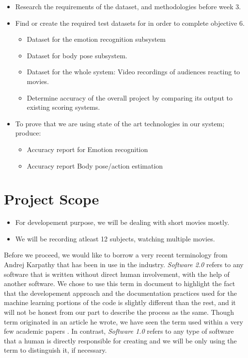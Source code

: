 \documentclass[12pt,a4paper,man]{report}
\begin{document}
\begin{itemize}
\item Research the requirements of the dataset, and methodologies before week 3.
\item Find or create the required test datasets for in order to complete objective 6.
\begin{itemize}
\item Dataset for the emotion recognition subsystem
\item Dataset for body pose subsystem.
\item Dataset for the whole system: Video recordings of audiences reacting to movies.
\item Determine accuracy of the overall project by comparing its output to existing scoring systems.
\end{itemize}
\item To prove that we are using state of the art technologies in our system; produce:
\begin{itemize}
\item Accuracy report for Emotion recognition
\item Accuracy report Body pose/action estimation
\end{itemize}
\end{itemize}

\chapter{Project Scope}
\label{sec:org2caf9ae}
\begin{itemize}
\item For developement purpose, we will be dealing with short movies mostly.
\item We will be recording atleast 12 subjects, watching multiple movies.
\end{itemize}

Before we proceed, we would like to borrow a very recent terminology from Andrej Karpathy that has been in use in the industry. \emph{Software 2.0} refers to any software that is written without direct human involvement, with the help of another software. We chose to use this term in document to highlight the fact that the developement approach and the documentation practices used for the machine learning portions of the code is slightly different than the rest, and it will not be honest from our part to describe the process as the same. Though term originated in an article he wrote, we have seen the term used within a very few academic papers \cite{ratner2018snorkel}. In contrast, \emph{Software 1.0} refers to any type of software that a human is directly responsible for creating and we will be only using the term to distinguish it, if necessary.
\end{document}
